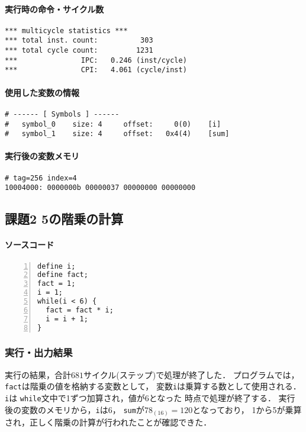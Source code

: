 \paragraph*{実行時の命令・サイクル数}

\begin{Verbatim}[numbers=none, frame=single,
fontsize=\small, baselinestretch=0.8]
*** multicycle statistics ***
*** total inst. count:          303
*** total cycle count:         1231
***               IPC:   0.246 (inst/cycle)
***               CPI:   4.061 (cycle/inst)  
\end{Verbatim}

\paragraph*{使用した変数の情報}
\begin{Verbatim}[numbers=none, frame=single,
  fontsize=\small, baselinestretch=0.8]
# ------ [ Symbols ] ------
# 	symbol_0 	size: 4 	offset:     0(0) 	[i]
# 	symbol_1 	size: 4 	offset:   0x4(4) 	[sum]
\end{Verbatim}

\paragraph*{実行後の変数メモリ}
\begin{Verbatim}[numbers=none, frame=single,
  fontsize=\small, baselinestretch=0.8]
# tag=256 index=4
10004000: 0000000b 00000037 00000000 00000000
\end{Verbatim}

\subsection{課題2 5の階乗の計算}
\paragraph*{ソースコード}

\begin{Verbatim}[numbers=left, xleftmargin=10mm, numbersep=6pt, frame=single,
  fontsize=\small, baselinestretch=0.8]
define i;
define fact;
fact = 1;
i = 1;
while(i < 6) {
  fact = fact * i;
  i = i + 1;
}
\end{Verbatim}

\subsubsection{実行・出力結果}
実行の結果，合計$681$サイクル(ステップ)で処理が終了した．
プログラムでは，\verb|fact|は階乗の値を格納する変数として，
変数\verb|i|は乗算する数として使用される．\verb|i|は
\verb|while|文中で1ずつ加算され，値が$6$となった
時点で処理が終了する．
実行後の変数のメモリから，\verb|i|は$6$，
\verb|sum|が$78_{(16)} = 120$となっており，
1から5が乗算され，正しく階乗の計算が行われたことが確認できた．

